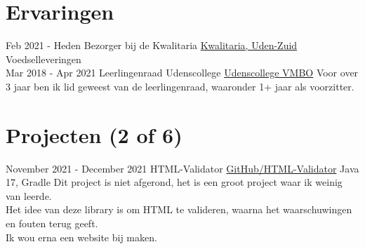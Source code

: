 \documentclass[letterpaper]{twentysecondcv} %
\begin{document}
    \vspace{6mm}




    \section{Ervaringen}
    \begin{twenty} %
        \twentyitem
        {Feb 2021 -}
        {Heden}
        {Bezorger bij de Kwalitaria}
        {\href{https://kwalitaria.nl/uden-zuid/uden-zuid/}{Kwalitaria, Uden-Zuid}}
        {}
        {Voedselleveringen}\\
        \twentyitem
        {Mar 2018 -}
        {Apr 2021}
        {Leerlingenraad Udenscollege}
        {\href{https://www.udenscollege.nl/vmbo/startpagina-vmbo/}{Udenscollege VMBO}}
        {}
        {
            Voor over 3 jaar ben ik lid geweest van de leerlingenraad, waaronder 1+ jaar als voorzitter.
        }
    \end{twenty}

    \vspace{6mm}




    \section{Projecten (2 of 6)}

    \twentyitem
    {November 2021 -}
    {December 2021}
    {HTML-Validator}
    {\href{https://github.com/Tais993/HTML-Validator/}{GitHub/HTML-Validator}}
    {Java 17, Gradle}
    {
        Dit project is niet afgerond, het is een groot project waar ik weinig van leerde.\\

        Het idee van deze library is om HTML te valideren, waarna het waarschuwingen en fouten terug geeft.\\
        Ik wou erna een website bij maken.}
\end{document}
